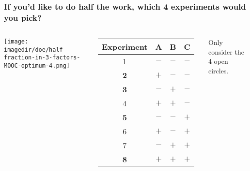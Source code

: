 \begin{frame}\frametitle{If you'd like to do half the work, which 4 experiments would you pick?}
	\begin{columns}
			\begin{center}
				\texttt{[image: \\imagedir/doe/half-fraction-in-3-factors-MOOC-optimum-4.png]}
			\end{center}
			
			\begin{tabulary}{\linewidth}{|c||c|c|c|}\hline 
				\textsf{\relax Experiment } & \textbf{\relax A } & \textbf{\relax B } & \textbf{\relax C } \\
				\hline \color{lightgray} 1 & \color{lightgray} \(-\) & \color{lightgray}\(-\) & \color{lightgray}\(-\) \\
				\hline \color{myOrange} \textbf{2} & \(+\) & \(-\) & \(-\) \\
				\hline \color{myOrange} \textbf{3} & \(-\) & \(+\) & \(-\) \\
				\hline \color{lightgray}4 & \color{lightgray}\(+\) & \color{lightgray}\(+\) & \color{lightgray}\(-\) \\
				\hline \color{myOrange} \textbf{5} & \(-\) & \(-\) & \(+\) \\
				\hline \color{lightgray}6 & \color{lightgray}\(+\) & \color{lightgray}\(-\) & \color{lightgray}\(+\) \\
				\hline \color{lightgray}7 & \color{lightgray}\(-\) & \color{lightgray}\(+\) & \color{lightgray}\(+\) \\
				\hline \color{myOrange} \textbf{8} & \(+\) & \(+\) & \(+\) \\
				\hline
			\end{tabulary}
			
			\vspace{1cm}
			{\color{myOrange} Only consider the 4 open circles.}
	\end{columns}	

\end{frame}


